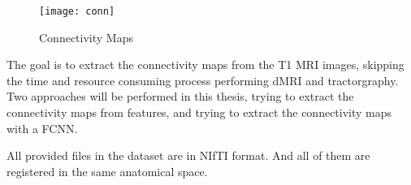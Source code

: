 \begin{figure}[H]
\centering
\texttt{[image: conn]}
\caption{Connectivity Maps}
\label{fig:conn}
\end{figure}

The goal is to extract the connectivity maps from the T1 \ac{MRI} images, skipping the time and resource consuming process performing \ac{dMRI} and tractorgraphy. Two approaches will be performed in this thesis, trying to extract the connectivity maps from  features, and trying to extract the connectivity maps with a \ac{FCNN}.\par

All provided files in the dataset are in \ac{NIfTI} format. And all of them are registered in the same anatomical space.\par